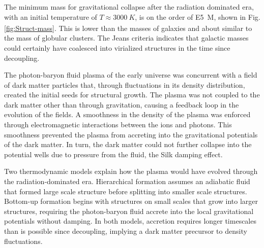 \documentclass{paper}
\begin{document}
  The minimum mass for gravitational collapse after the radiation dominated
  era, with an initial temperature of \(T \approx \SI{3000}{K}\), is on the 
  order of \SI{E5}{M_{\astrosun}}, shown in Fig. \ref{fig:Struct-mass}.
  This is lower than the masses of galaxies and about 
  similar to the mass of globular clusters.
  The Jeans criteria indicates that galactic masses could certainly have 
  coalesced into virialized structures in the time since decoupling.

  The photon-baryon fluid plasma of the early universe was concurrent with a field of 
  dark matter particles that, through fluctuations in its density 
  distribution, created the initial seeds for structural growth. The plasma 
  was not coupled to the dark matter other than through gravitation, causing
  a feedback loop in the evolution of the fields. A smoothness in the density
  of the plasma was enforced through electromagnetic interactions between the ions and
  photons. 
  This smoothness prevented the plasma from 
  accreting into the gravitational potentials of the dark matter. In turn, the 
  dark matter could not further collapse into the potential wells due 
  to pressure from the fluid, the Silk damping effect.  

  Two thermodynamic models explain how the plasma 
  would have evolved through the radiation-dominated era. Hierarchical
  formation assumes an adiabatic fluid that formed large scale structure 
  before splitting into smaller scale structures. Bottom-up formation
  begins with structures on small scales that grow into larger structures, 
  requiring the photon-baryon fluid 
  accrete into the local gravitational potentials without 
  damping. In both models, accretion requires longer timescales than 
  is possible since decoupling, implying a dark matter precursor to 
  density fluctuations.


  
\end{document}
